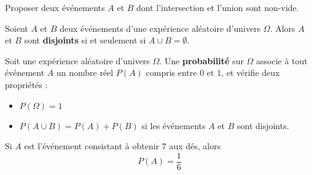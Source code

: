 \documentclass{article}
\begin{document}
\begin{center}
\end{center}
\begin{example}
Proposer deux événements $A$ et $B$ dont l'intersection et l'union sont non-vide.

\emptybox{2cm}
\end{example}
\newpage
\begin{definition}
Soient $A$ et $B$ deux événements d'une expérience aléatoire d'univers $\Omega$. Alors $A$ et $B$ sont \textbf{disjoints} si et seulement si $A \cup B = \emptyset$.
\end{definition}
\begin{definition}
Soit une expérience aléatoire d'univers $\Omega$. Une \textbf{probabilité} sur $\Omega$ associe à tout événement $A$ un nombre réel $P(A)$ compris entre $0$ et $1$, et vérifie deux propriétés :
\begin{itemize}
\item $P(\Omega) = 1$
\item $P(A \cup B) = P(A) + P(B)$ si les événements $A$ et $B$ sont disjoints.
\end{itemize}
\end{definition}
\begin{example}
Si $A$ est l'événement consistant à obtenir $7$ aux dés, alors
\begin{equation*}
P(A) = \dfrac{1}{6}
\end{equation*}
\end{example}
\end{document}
